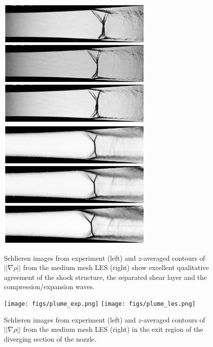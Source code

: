 \documentclass[]{aiaa-tc}%
\begin{document}
\begin{figure}[!h]%
	\begin{center}
	\includegraphics[width=3in]{../../figs/exp_montage.jpg}
	\includegraphics[width=3in]{../../figs/sim_montage.jpg}
	\end{center}
 	\caption{Schlieren images from experiment \cite{Papam:10} (left) and $z$-averaged contours of $||\nabla\rho||$ from the medium mesh LES (right) show excellent qualitative agreement of the shock structure, the separated shear layer and the compression/expansion waves.  }
 	\label{fig:schl}
\end{figure}


\begin{figure}[!h]%
	\begin{center}
	\texttt{[image: figs/plume\_exp.png]}
	\texttt{[image: figs/plume\_les.png]}
	\end{center}
 	\caption{Schlieren images from experiment \cite{Papam:10} (left) and $z$-averaged contours of $||\nabla\rho||$ from the medium mesh LES (right) in the exit region of the diverging section of the nozzle.  }
 	\label{fig:schl_ex}
\end{figure}
\end{document}
